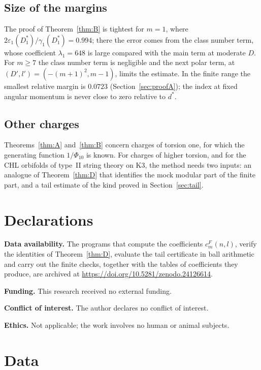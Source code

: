 \documentclass[11pt]{amsart}
\theoremstyle{definition}
\newcommand{\cF}{c^{F}}
\newcommand{\dstar}{d^{*}}
\newcommand{\zenodoCodeDOI}{10.5281/zenodo.24126614}
\begin{document}
\subsection*{Size of the margins}
The proof of Theorem~\ref{thm:B} is tightest for $m=1$, where $2\varepsilon_1(D^*_1)/\gamma_1(D^*_1)=0.994$; there the error comes from the class number term, whose coefficient $\lambda_1=648$ is large compared with the main term at moderate $D$. For $m\ge7$ the class number term is negligible and the next polar term, at $(D',l')=(-(m+1)^2,m-1)$, limits the estimate. In the finite range the smallest relative margin is $0.0723$ (Section~\ref{sec:proofA}); the index at fixed angular momentum is never close to zero relative to $\dstar$.

\subsection*{Other charges}
Theorems~\ref{thm:A} and~\ref{thm:B} concern charges of torsion one, for which the generating function $1/\Phi_{10}$ is known. For charges of higher torsion, and for the CHL orbifolds of type~II string theory on K3, the method needs two inputs: an analogue of Theorem~\ref{thm:D} that identifies the mock modular part of the finite part, and a tail estimate of the kind proved in Section~\ref{sec:tail}.

\section*{Declarations}

\noindent\textbf{Data availability.} The programs that compute the coefficients $\cF_m(n,l)$, verify the identities of Theorem~\ref{thm:D}, evaluate the tail certificate in ball arithmetic and carry out the finite checks, together with the tables of coefficients they produce, are archived at \url{https://doi.org/\zenodoCodeDOI}.

\smallskip\noindent\textbf{Funding.} This research received no external funding.

\smallskip\noindent\textbf{Conflict of interest.} The author declares no conflict of interest.

\smallskip\noindent\textbf{Ethics.} Not applicable; the work involves no human or animal subjects.

\appendix

\section{Data}\label{app:data}
\end{document}
